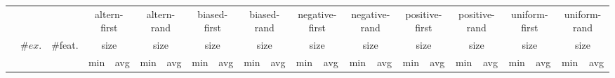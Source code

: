 \begin{tabular}{lccrrrrrrrrrrrrrrrrrrrr}
\toprule
& && \multicolumn{2}{c}{altern-first} & \multicolumn{2}{c}{altern-rand} & \multicolumn{2}{c}{biased-first} & \multicolumn{2}{c}{biased-rand} & \multicolumn{2}{c}{negative-first} & \multicolumn{2}{c}{negative-rand} & \multicolumn{2}{c}{positive-first} & \multicolumn{2}{c}{positive-rand} & \multicolumn{2}{c}{uniform-first} & \multicolumn{2}{c}{uniform-rand}\\
\cmidrule(rr){4-5}\cmidrule(rr){6-7}\cmidrule(rr){8-9}\cmidrule(rr){10-11}\cmidrule(rr){12-13}\cmidrule(rr){14-15}\cmidrule(rr){16-17}\cmidrule(rr){18-19}\cmidrule(rr){20-21}\cmidrule(rr){22-23}
&\multirow{2}{*}{$\#ex.$} & \multirow{2}{*}{\#feat.} &  \multicolumn{2}{c}{size} & \multicolumn{2}{c}{size} & \multicolumn{2}{c}{size} & \multicolumn{2}{c}{size} & \multicolumn{2}{c}{size} & \multicolumn{2}{c}{size} & \multicolumn{2}{c}{size} & \multicolumn{2}{c}{size} & \multicolumn{2}{c}{size} & \multicolumn{2}{c}{size} \\\cmidrule(rl){4-5}\cmidrule(rl){6-7}\cmidrule(rl){8-9}\cmidrule(rl){10-11}\cmidrule(rl){12-13}\cmidrule(rl){14-15}\cmidrule(rl){16-17}\cmidrule(rl){18-19}\cmidrule(rl){20-21}\cmidrule(rl){22-23}
&& & \multicolumn{1}{c}{min} & \multicolumn{1}{c}{avg} & \multicolumn{1}{c}{min} & \multicolumn{1}{c}{avg} & \multicolumn{1}{c}{min} & \multicolumn{1}{c}{avg} & \multicolumn{1}{c}{min} & \multicolumn{1}{c}{avg} & \multicolumn{1}{c}{min} & \multicolumn{1}{c}{avg} & \multicolumn{1}{c}{min} & \multicolumn{1}{c}{avg} & \multicolumn{1}{c}{min} & \multicolumn{1}{c}{avg} & \multicolumn{1}{c}{min} & \multicolumn{1}{c}{avg} & \multicolumn{1}{c}{min} & \multicolumn{1}{c}{avg} & \multicolumn{1}{c}{min} & \multicolumn{1}{c}{avg} \\
\midrule


\end{tabular}
